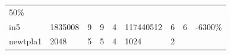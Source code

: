\documentclass[
]{book}
\begin{document}
\begin{longtable}[]{@{}lllllllll@{}}
\begin{minipage}[t]{0.07\columnwidth}
50\%\strut
\end{minipage}\tabularnewline
\begin{minipage}[t]{0.07\columnwidth}\raggedright
in5\strut
\end{minipage} & \begin{minipage}[t]{0.11\columnwidth}\raggedright
1835008\strut
\end{minipage} & \begin{minipage}[t]{0.08\columnwidth}\raggedright
9\strut
\end{minipage} & \begin{minipage}[t]{0.07\columnwidth}\raggedright
9\strut
\end{minipage} & \begin{minipage}[t]{0.09\columnwidth}\raggedright
4\strut
\end{minipage} & \begin{minipage}[t]{0.12\columnwidth}\raggedright
117440512\strut
\end{minipage} & \begin{minipage}[t]{0.08\columnwidth}\raggedright
6\strut
\end{minipage} & \begin{minipage}[t]{0.07\columnwidth}\raggedright
6\strut
\end{minipage} & \begin{minipage}[t]{0.07\columnwidth}\raggedright
-6300\%\strut
\end{minipage}\tabularnewline
\begin{minipage}[t]{0.07\columnwidth}\raggedright
newtpla1\strut
\end{minipage} & \begin{minipage}[t]{0.11\columnwidth}\raggedright
2048\strut
\end{minipage} & \begin{minipage}[t]{0.08\columnwidth}\raggedright
5\strut
\end{minipage} & \begin{minipage}[t]{0.07\columnwidth}\raggedright
5\strut
\end{minipage} & \begin{minipage}[t]{0.09\columnwidth}\raggedright
4\strut
\end{minipage} & \begin{minipage}[t]{0.12\columnwidth}\raggedright
1024\strut
\end{minipage} & \begin{minipage}[t]{0.08\columnwidth}\raggedright
2\strut
\end{minipage} & \begin{minipage}[t]{0.07\columnwidth}\raggedright

\end{minipage}
\end{longtable}
\end{document}
